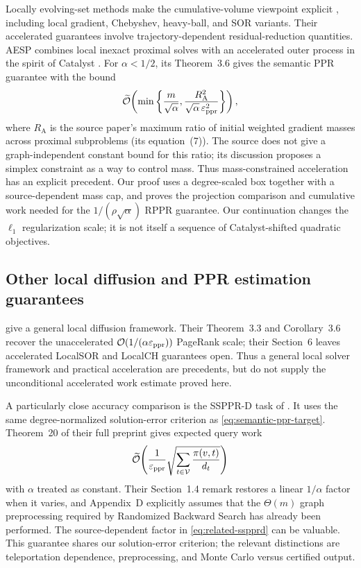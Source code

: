 Locally evolving-set methods make the cumulative-volume viewpoint explicit
\citep{zhou2024iterative}, including local gradient, Chebyshev, heavy-ball,
and SOR variants. Their accelerated guarantees involve trajectory-dependent
residual-reduction quantities. AESP \citep{huang2025accelerated} combines
local inexact proximal solves with an accelerated outer process in the
spirit of Catalyst \citep{lin2018catalyst}. For $\alpha<1/2$, its
Theorem~3.6 gives the semantic PPR guarantee with the bound
\begin{equation*}
 \widetilde{\mathcal{O}}\!\left(\min\left\{\frac m{\sqrt\alpha},
                  \frac{R_{\mathrm{A}}^2}{\sqrt\alpha\,\varepsilon_{\mathrm{ppr}}^2}
             \right\}\right),
\end{equation*}
where $R_{\mathrm{A}}$ is the source paper's maximum ratio of initial
weighted gradient masses across proximal subproblems (its equation~(7)).
The source does not give a graph-independent constant bound for this ratio;
its discussion proposes a simplex constraint as a way to control mass.
Thus mass-constrained acceleration has an explicit precedent. Our proof
uses a degree-scaled box together with a source-dependent mass cap, and
proves the projection comparison and cumulative work needed for the
$1/(\rho\sqrt\alpha)$ RPPR guarantee. Our continuation changes the
$\ell_1$ regularization scale; it is not itself a sequence of
Catalyst-shifted quadratic objectives.

\subsection{Other local diffusion and PPR estimation guarantees}

\citet{bai2024faster} give a general local diffusion framework. Their
Theorem~3.3 and Corollary~3.6 recover the unaccelerated
$\mathcal{O}(1/(\alpha\varepsilon_{\mathrm{ppr}}))$ PageRank scale; their Section~6 leaves accelerated
LocalSOR and LocalCH guarantees open. Thus a general local solver framework
and practical acceleration are precedents, but do not supply the
unconditional accelerated work estimate proved here.

A particularly close accuracy comparison is the SSPPR-D task of
\citet{wei2024absolute}. It uses the same degree-normalized solution-error
criterion as \cref{eq:semantic-ppr-target}. Theorem~20 of their full
preprint gives expected query work
\begin{equation}
 \widetilde{\mathcal{O}}\!\left(\frac1{\varepsilon_{\mathrm{ppr}}}
       \sqrt{\sum_{t\in\mathcal{V}}\frac{\pi(v,t)}{d_t}}\right)
 \label{eq:related-sspprd}
\end{equation}
with $\alpha$ treated as constant. Their Section~1.4 remark restores a
linear $1/\alpha$ factor when it varies, and Appendix~D explicitly assumes
that the $\Theta(m)$ graph preprocessing required by Randomized Backward
Search has already been performed. The source-dependent factor in
\cref{eq:related-sspprd} can be valuable. This guarantee shares our
solution-error criterion; the relevant distinctions are teleportation
dependence, preprocessing, and Monte Carlo versus certified output.

